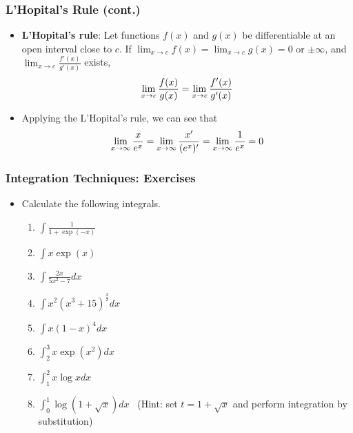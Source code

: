 \documentclass[pdflatex, 12pt]{beamer}
\begin{document}
\begin{frame}
\frametitle{L'Hopital's Rule (cont.)}
\begin{itemize}
\item \textbf{L'Hopital's rule}: Let functions $f(x)$ and $g(x)$ be differentiable at an open interval close to $c$. If $\lim_{x \to c} f(x) = \lim_{x \to c} g(x) = 0$ or $\pm\infty$, and $\lim_{x \to c} \frac{f'(x)}{g'(x)}$ exists,
 \begin{equation}
 \lim_{x \to c} \frac{f(x)}{g(x)} = \lim_{x \to c} \frac{f'(x)}{g'(x)} \notag 
 \end{equation} 
\vspace{0.1cm}
\item Applying the L'Hopital's rule, we can see that
 \begin{equation}
 \lim_{x \to \infty} \frac{x}{e^x} = \lim_{x \to \infty} \frac{x'}{(e^x)'} = \lim_{x \to \infty} \frac{1}{e^x} = 0 \notag 
 \end{equation} 
\end{itemize}
\end{frame}

\begin{frame}
\frametitle{Integration Techniques: Exercises}
\begin{itemize}
\item Calculate the following integrals.
 \begin{enumerate}
 \item $\int \frac{1}{1 + \exp(-x)}$
 \vspace{0.1cm}
 \item $\int x\exp(x)$
 \vspace{0.1cm}
 \item $\int \frac{2x}{5 x^2 - 7} dx$
 \vspace{0.1cm}
 \item $\int x^2 (x^3 + 15)^{\frac{3}{2}} dx$
 \item $\int x(1 - x)^4 dx$
 \item $\int^3_2 x\exp(x^2)dx$
 \item $\int^2_1 x\log x dx$
 \item $\int^1_0 \log (1 + \sqrt{x})dx$ \ (Hint: set $t = 1 + \sqrt{x}$ and perform integration by substitution)
 \end{enumerate}
\end{itemize}
\end{frame}
\end{document}
